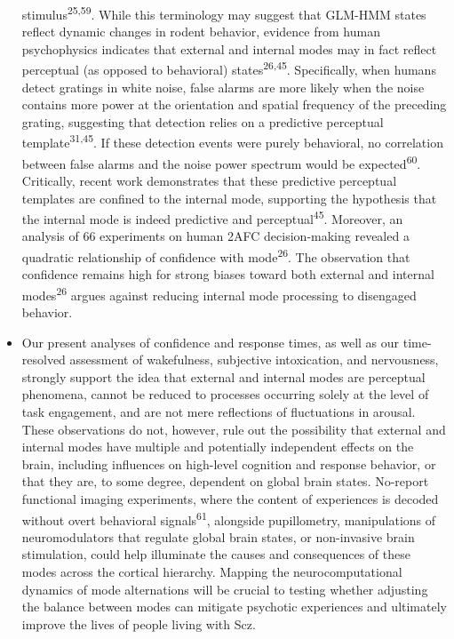 \documentclass[
]{article}
\begin{document}
\begin{itemize}
  stimulus\textsuperscript{25,59}. While this terminology may suggest
  that GLM-HMM states reflect dynamic changes in rodent behavior,
  evidence from human psychophysics indicates that external and internal
  modes may in fact reflect perceptual (as opposed to behavioral)
  states\textsuperscript{26,45}. Specifically, when humans detect
  gratings in white noise, false alarms are more likely when the noise
  contains more power at the orientation and spatial frequency of the
  preceding grating, suggesting that detection relies on a predictive
  perceptual template\textsuperscript{31,45}. If these detection events
  were purely behavioral, no correlation between false alarms and the
  noise power spectrum would be expected\textsuperscript{60}.
  Critically, recent work demonstrates that these predictive perceptual
  templates are confined to the internal mode, supporting the hypothesis
  that the internal mode is indeed predictive and
  perceptual\textsuperscript{45}. Moreover, an analysis of 66
  experiments on human 2AFC decision-making revealed a quadratic
  relationship of confidence with mode\textsuperscript{26}. The
  observation that confidence remains high for strong biases toward both
  external and internal modes\textsuperscript{26} argues against
  reducing internal mode processing to disengaged behavior.
\item
  Our present analyses of confidence and response times, as well as our
  time-resolved assessment of wakefulness, subjective intoxication, and
  nervousness, strongly support the idea that external and internal
  modes are perceptual phenomena, cannot be reduced to processes
  occurring solely at the level of task engagement, and are not mere
  reflections of fluctuations in arousal. These observations do not,
  however, rule out the possibility that external and internal modes
  have multiple and potentially independent effects on the brain,
  including influences on high-level cognition and response behavior, or
  that they are, to some degree, dependent on global brain states.
  No-report functional imaging experiments, where the content of
  experiences is decoded without overt behavioral
  signals\textsuperscript{61}, alongside pupillometry, manipulations of
  neuromodulators that regulate global brain states, or non-invasive
  brain stimulation, could help illuminate the causes and consequences
  of these modes across the cortical hierarchy. Mapping the
  neurocomputational dynamics of mode alternations will be crucial to
  testing whether adjusting the balance between modes can mitigate
  psychotic experiences and ultimately improve the lives of people
  living with Scz.
\end{itemize}
\end{document}
